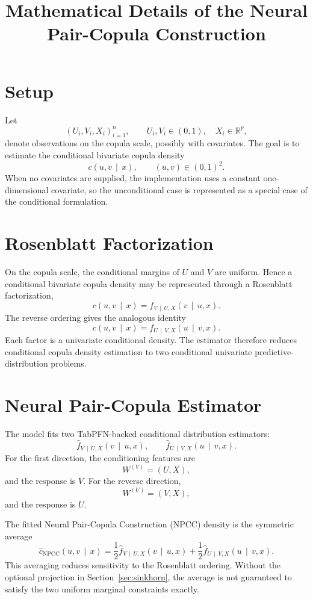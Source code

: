 \documentclass[11pt]{article}
\title{Mathematical Details of the Neural Pair-Copula Construction}
\author{}
\date{}
\newcommand{\R}{\mathbb{R}}
\newcommand{\given}{\,\mid\,}
\newcommand{\npcc}{\mathrm{NPCC}}
\begin{document}
\maketitle

\section{Setup}

Let
\[
  (U_i,V_i,X_i)_{i=1}^n,
  \qquad
  U_i,V_i \in (0,1), \quad X_i \in \R^p,
\]
denote observations on the copula scale, possibly with covariates.
The goal is to estimate the conditional bivariate copula density
\[
  c(u,v \given x),
  \qquad (u,v) \in (0,1)^2.
\]
When no covariates are supplied, the implementation uses a constant
one-dimensional covariate, so the unconditional case is represented as
a special case of the conditional formulation.

\section{Rosenblatt Factorization}

On the copula scale, the conditional margins of $U$ and $V$ are uniform.
Hence a conditional bivariate copula density may be represented through a
Rosenblatt factorization,
\[
  c(u,v \given x)
  =
  f_{V \given U,X}(v \given u,x).
\]
The reverse ordering gives the analogous identity
\[
  c(u,v \given x)
  =
  f_{U \given V,X}(u \given v,x).
\]
Each factor is a univariate conditional density. The estimator therefore
reduces conditional copula density estimation to two conditional
univariate predictive-distribution problems.

\section{Neural Pair-Copula Estimator}

The model fits two TabPFN-backed conditional distribution estimators:
\[
  \widehat f_{V \given U,X}(v \given u,x),
  \qquad
  \widehat f_{U \given V,X}(u \given v,x).
\]
For the first direction, the conditioning features are
\[
  W^{(V)} = (U,X),
\]
and the response is $V$. For the reverse direction,
\[
  W^{(U)} = (V,X),
\]
and the response is $U$.

The fitted Neural Pair-Copula Construction (NPCC) density is the
symmetric average
\begin{equation}
  \widehat c_{\npcc}(u,v \given x)
  =
  \frac{1}{2}\widehat f_{V \given U,X}(v \given u,x)
  +
  \frac{1}{2}\widehat f_{U \given V,X}(u \given v,x).
  \label{eq:symmetric-density}
\end{equation}
This averaging reduces sensitivity to the Rosenblatt ordering. Without
the optional projection in Section~\ref{sec:sinkhorn}, the average is
not guaranteed to satisfy the two uniform marginal constraints exactly.
\end{document}
